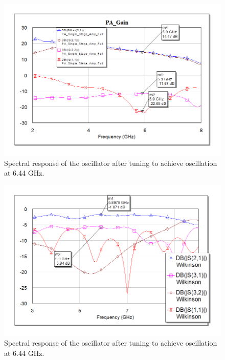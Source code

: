 \documentclass[reprint, aps, prl]{revtex4-1}
\begin{document}
\begin{figure}[!htbp]
    \centering
    \includegraphics[scale=0.35]{PA_Gain.png}
    \caption{Spectral response of the oscillator after tuning to achieve oscillation at 6.44 GHz.}
    \label{fig:PAGain}
\end{figure}

\begin{figure}[!htbp]
    \centering
    \includegraphics[scale=0.35]{Unbalanced_Wilkinson_params.png}
    \caption{Spectral response of the oscillator after tuning to achieve oscillation at 6.44 GHz.}
    \label{fig:AsWilkParams}
\end{figure}
\end{document}
